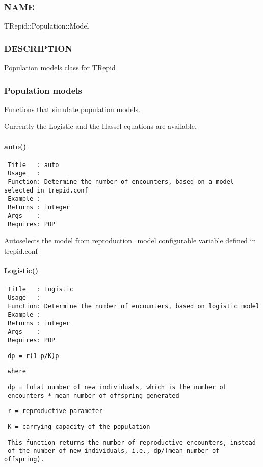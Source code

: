 \subsubsection*{NAME\label{NAME}}


TRepid::Population::Model

\subsubsection*{DESCRIPTION\label{DESCRIPTION}}


Population models class for TRepid

\subsubsection*{Population models\label{Population_models}}


Functions that simulate population models.



Currently the Logistic and the Hassel equations are available.

\paragraph*{auto()\label{auto_}}
\begin{verbatim}
 Title   : auto
 Usage   :
 Function: Determine the number of encounters, based on a model selected in trepid.conf
 Example :
 Returns : integer
 Args    :
 Requires: POP
\end{verbatim}


Autoselects the model from reproduction\_model configurable variable defined in trepid.conf

\paragraph*{Logistic()\label{Logistic_}}
\begin{verbatim}
 Title   : Logistic
 Usage   :
 Function: Determine the number of encounters, based on logistic model
 Example :
 Returns : integer
 Args    :
 Requires: POP
\end{verbatim}
\begin{verbatim}
 dp = r(1-p/K)p
\end{verbatim}
\begin{verbatim}
 where
\end{verbatim}
\begin{verbatim}
 dp = total number of new individuals, which is the number of
 encounters * mean number of offspring generated
\end{verbatim}
\begin{verbatim}
 r = reproductive parameter
\end{verbatim}
\begin{verbatim}
 K = carrying capacity of the population
\end{verbatim}
\begin{verbatim}
 This function returns the number of reproductive encounters, instead
 of the number of new individuals, i.e., dp/(mean number of offspring).
\end{verbatim}
